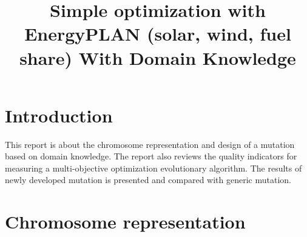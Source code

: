 \documentclass{article}
\begin{document}
\title{Simple optimization with EnergyPLAN (solar, wind, fuel share) With Domain Knowledge}
\maketitle

\section{Introduction}

This report is about the chromosome representation and design of a mutation based on domain knowledge. The report also reviews the quality indicators for measuring a multi-objective optimization evolutionary algorithm. 
The results of newly developed mutation is presented and compared with generic mutation.
 

\section{Chromosome representation}
\end{document}
